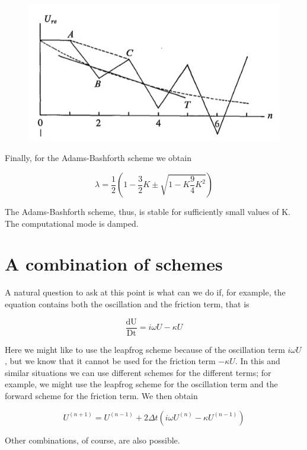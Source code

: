 \begin{figure}
    \centering
    \includegraphics[width = .7 \textwidth]{figs/NM/pic10.jpg}
    \caption{} \label{fig:}
\end{figure}

Finally, for the Adams-Bashforth scheme we obtain

\[\lambda = \frac{1}{2}\left( 1 - \frac{3}{2}K \pm \sqrt{1 - K\frac{9}{4}K^{2}} \right)\]

The Adams-Bashforth scheme, thus, is stable for sufficiently small
values of K. The computational mode is damped.

\section{A combination of schemes}\label{sec:combination-of-schemes}

A natural question to ask at this point is what can we do if, for
example, the equation contains both the oscillation and the friction
term, that is

\[\frac{\text{dU}}{\text{Dt}} = i\omega U - \kappa U\]

Here we might like to use the leapfrog scheme because of the oscillation
term \(i\omega U\), but we know that it cannot be used for the friction
term \(- \kappa U\). In this and similar situations we can use different
schemes for the different terms; for example, we might use the leapfrog
scheme for the oscillation term and the forward scheme for the friction
term. We then obtain

\[U^{\left( n + 1 \right)} = U^{\left( n - 1 \right)} + 2\Delta t\left( i\omega U^{\left( n \right)} - \kappa U^{\left( n - 1 \right)} \right)\]

Other combinations, of course, are also possible.